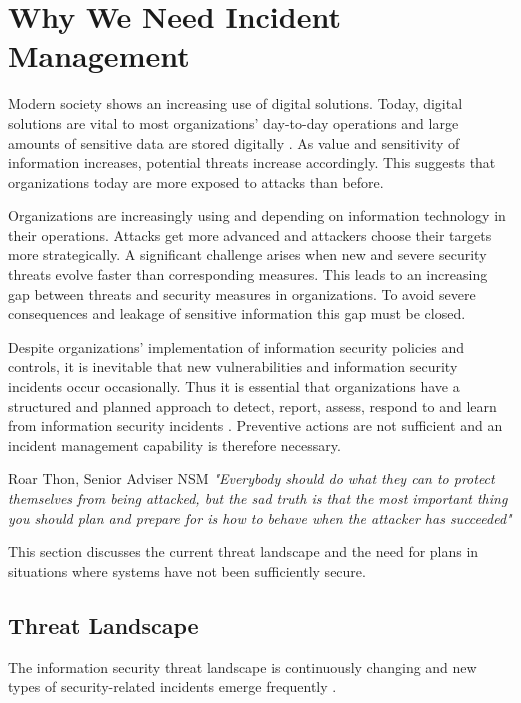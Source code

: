 \section{Why We Need Incident Management}
Modern society shows an increasing use of digital solutions. Today, digital solutions are vital to most organizations' day-to-day operations and large amounts of sensitive data are stored digitally \cite{KriposTrender}. As value and sensitivity of information increases, potential threats increase accordingly. This suggests that organizations today are more exposed to attacks than before. 

Organizations are increasingly using and depending on information technology in their operations. Attacks get more advanced and attackers choose their targets more strategically. A significant challenge arises when new and severe security threats evolve faster than corresponding measures. This leads to an increasing gap between threats and security measures in organizations. To avoid severe consequences and leakage of sensitive information this gap must be closed.

Despite organizations' implementation of information security policies and controls, it is inevitable that new vulnerabilities and information security incidents occur occasionally. Thus it is essential that organizations have a structured and planned approach to detect, report, assess, respond to and learn from information security incidents \cite{ISO/IEC27035}. Preventive actions are not sufficient and an incident management capability is therefore necessary.

\begin{newquote}{Roar Thon, Senior Adviser \acs{NSM}}
\textit{"Everybody should do what they can to protect themselves from being attacked, but the sad truth is that the most important thing you should plan and prepare for is how to behave when the attacker has succeeded"}
\end{newquote}

This section discusses the current threat landscape and the need for plans in situations where systems have not been sufficiently secure. 

\subsection{Threat Landscape}
\label{sec:threatLandscape}
The information security threat landscape is continuously changing and new types of security-related incidents emerge frequently \cite{nist800-61}. %

